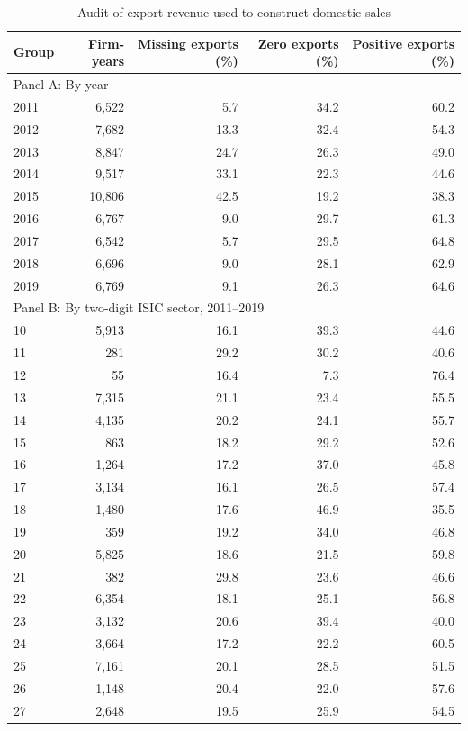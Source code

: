 \begin{table}[!htbp]\centering
\caption{Audit of export revenue used to construct domestic sales}
\label{tab:domestic_sales_export_audit}
\begin{tabular}{lrrrr}
\toprule
Group & Firm-years & Missing exports (\%) & Zero exports (\%) & Positive exports (\%) \\
\midrule
\multicolumn{5}{l}{Panel A: By year} \\
2011 & 6,522 & 5.7 & 34.2 & 60.2 \\
2012 & 7,682 & 13.3 & 32.4 & 54.3 \\
2013 & 8,847 & 24.7 & 26.3 & 49.0 \\
2014 & 9,517 & 33.1 & 22.3 & 44.6 \\
2015 & 10,806 & 42.5 & 19.2 & 38.3 \\
2016 & 6,767 & 9.0 & 29.7 & 61.3 \\
2017 & 6,542 & 5.7 & 29.5 & 64.8 \\
2018 & 6,696 & 9.0 & 28.1 & 62.9 \\
2019 & 6,769 & 9.1 & 26.3 & 64.6 \\
\midrule
\multicolumn{5}{l}{Panel B: By two-digit ISIC sector, 2011--2019} \\
10 & 5,913 & 16.1 & 39.3 & 44.6 \\
11 & 281 & 29.2 & 30.2 & 40.6 \\
12 & 55 & 16.4 & 7.3 & 76.4 \\
13 & 7,315 & 21.1 & 23.4 & 55.5 \\
14 & 4,135 & 20.2 & 24.1 & 55.7 \\
15 & 863 & 18.2 & 29.2 & 52.6 \\
16 & 1,264 & 17.2 & 37.0 & 45.8 \\
17 & 3,134 & 16.1 & 26.5 & 57.4 \\
18 & 1,480 & 17.6 & 46.9 & 35.5 \\
19 & 359 & 19.2 & 34.0 & 46.8 \\
20 & 5,825 & 18.6 & 21.5 & 59.8 \\
21 & 382 & 29.8 & 23.6 & 46.6 \\
22 & 6,354 & 18.1 & 25.1 & 56.8 \\
23 & 3,132 & 20.6 & 39.4 & 40.0 \\
24 & 3,664 & 17.2 & 22.2 & 60.5 \\
25 & 7,161 & 20.1 & 28.5 & 51.5 \\
26 & 1,148 & 20.4 & 22.0 & 57.6 \\
27 & 2,648 & 19.5 & 25.9 & 54.5 \\

\end{tabular}
\end{table}

